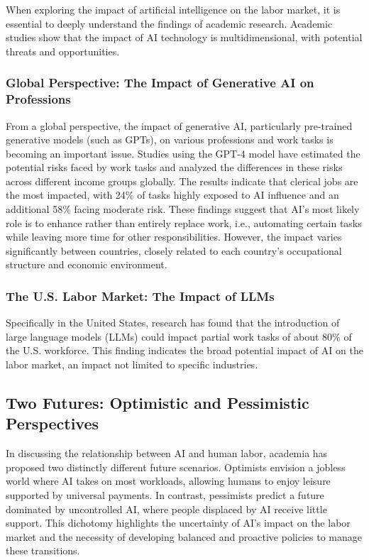 \documentclass[11pt]{article}
\begin{document}
When exploring the impact of artificial intelligence on the labor market, it is essential to deeply understand the findings of academic research. Academic studies show that the impact of AI technology is multidimensional, with potential threats and opportunities.

\subsubsection{Global Perspective: The Impact of Generative AI on Professions}

From a global perspective, the impact of generative AI, particularly pre-trained generative models (such as GPTs), on various professions and work tasks is becoming an important issue. Studies using the GPT-4 model have estimated the potential risks faced by work tasks and analyzed the differences in these risks across different income groups globally. The results indicate that
clerical jobs are the most impacted, with 24\% of tasks highly exposed to AI influence and an additional 58\% facing moderate risk. These findings suggest that AI's most likely role is to enhance rather than entirely replace work, i.e., automating certain tasks while leaving more time for other responsibilities. However, the impact varies significantly between countries, closely related to each country's occupational structure and economic environment.\cite{Gmyrek2023}

\subsubsection{The U.S. Labor Market: The Impact of LLMs}

Specifically in the United States, research has found that the introduction of large language models (LLMs) could impact partial work tasks of about 80\% of the U.S. workforce. This finding indicates the broad potential impact of AI on the labor market, an impact not limited to specific industries.\cite{Eloundou2023}

\subsection{Two Futures: Optimistic and Pessimistic Perspectives}

In discussing the relationship between AI and human labor, academia has proposed two distinctly different future scenarios. Optimists envision a jobless world where AI takes on most workloads, allowing humans to enjoy leisure supported by universal payments. In contrast, pessimists predict a future dominated by uncontrolled AI, where people displaced by AI receive little support. This dichotomy highlights the uncertainty of AI's impact on the labor market and the necessity of developing balanced and proactive policies to manage these transitions.\cite{AbuMusab2023}
\end{document}

